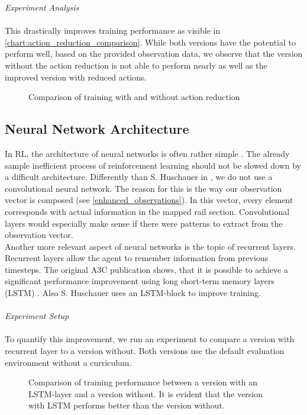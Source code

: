 \textit{Experiment Analysis}\\\\
This drastically improves training performance as visible in \autoref{chart:action_reduction_comparison}. While both versions have the potential to perform well, based on the provided observation data, we observe that the version without the action reduction is not able to perform nearly as well as the improved version with reduced actions.
\begin{figure}[H]
	\begin{center}
		
	\end{center}
	\caption{Comparison of training with and without action reduction}
	\label{chart:action_reduction_comparison}
\end{figure}
\subsection*{Neural Network Architecture}\label{network_architecture}
In RL, the architecture of neural networks is often rather simple \cite{mnih2013playing,a3c}. The already sample inefficient process of reinforcement learning should not be slowed down by a difficult architecture. Differently than S. Huschauer in \cite{flatlandstephan}, we do not use a convolutional neural network. The reason for this is the way our observation vector is composed (see \autoref{enhanced_observations}). In this vector, every element corresponds with actual information in the mapped rail section. Convolutional layers would especially make sense if there were patterns to extract from the observation vector.\\
Another more relevant aspect of neural networks is the topic of recurrent layers. Recurrent layers allow the agent to remember information from previous timesteps. The original A3C publication shows, that it is possible to achieve a significant performance improvement using long short-term memory layers (LSTM) \cite{a3c}. Also S. Huschauer uses an LSTM-block to improve training.\\\\
\textit{Experiment Setup}\\\\
To quantify this improvement, we run an experiment to compare a version with recurrent layer to a version without. Both versions use the default evaluation environment without a curriculum.
\begin{figure}[H]
	\begin{center}
		
	\end{center}
	\caption{Comparison of training performance between a version with an LSTM-layer and a version without. It is evident that the version with LSTM performs better than the version without.}
	\label{chart:lstm_comparison}
\end{figure}
